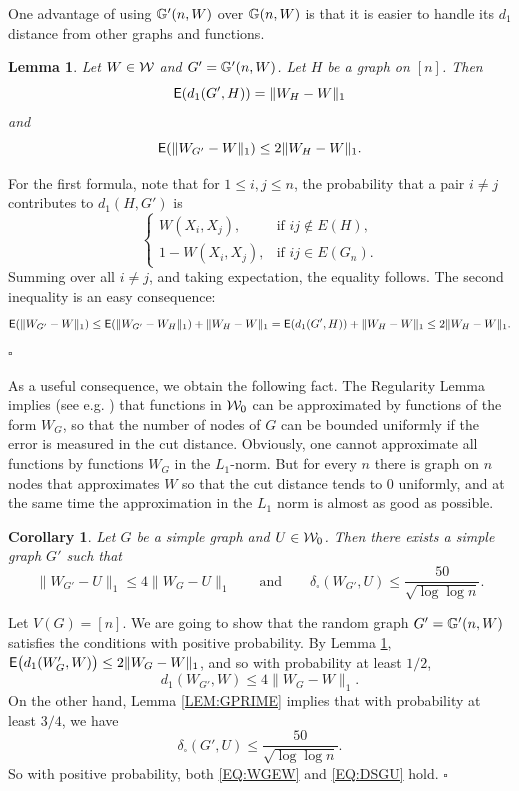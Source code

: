\documentclass{article}
\newtheorem{lemma}[theorem]{Lemma}
\newtheorem{corollary}[theorem]{Corollary}
\newenvironment{proof}{\medskip\noindent{\bf Proof. }}{\hfill$\square$\medskip}
\begin{document}
One advantage of using ${\mathbb G}'(n,W)$ over ${\mathbb G}(n,W)$ is that it is
easier to handle its $d_1$ distance from other graphs and functions.

\begin{lemma}\label{LEM:GPRIMEL1}
Let $W\in\mathcal{W}$ and $G'={\mathbb G}'(n,W)$. Let $H$ be a graph on $[n]$. Then
\[
{\sf E}(d_1(G',H))= \|W_H-W\|_1
\]
and
\[
{\sf E}(\|W_{G'}-W\|_1)\le 2\|W_H-W\|_1.
\]
\end{lemma}

\begin{proof}
For the first formula, note that for $1\le i,j\le n$, the probability
that a pair $i\not=j$ contributes to $d_1(H,G')$ is
\[
  \begin{cases}
    W(X_i,X_j), & \text{if $ij\notin E(H)$}, \\
    1-W(X_i,X_j), & \text{if $ij\in E(G_n)$}.
  \end{cases}
\]
Summing over all $i\not=j$, and taking expectation, the equality
follows. The second inequality is an easy consequence:
\[
{\sf E}(\|W_{G'}-W\|_1) \le {\sf E}(\|W_{G'}-W_H\|_1)+\|W_H-W\|_1
={\sf E}(d_1(G',H))+\|W_H-W\|_1\le 2\|W_H-W\|_1.
\]
\end{proof}

As a useful consequence, we obtain the following fact. The Regularity
Lemma implies (see e.g. \cite{LSz2}) that functions in $\mathcal{W}_0$ can be
approximated by functions of the form $W_G$, so that the number of
nodes of $G$ can be bounded uniformly if the error is measured in the
cut distance. Obviously, one cannot approximate all functions by
functions $W_G$ in the $L_1$-norm. But for every $n$ there is graph
on $n$ nodes that approximates $W$ so that the cut distance tends to
$0$ uniformly, and at the same time the approximation in the $L_1$
norm is almost as good as possible.

\begin{corollary}\label{COR:SQUARECLOSE}
Let $G$ be a simple graph and $U\in\mathcal{W}_0$. Then there exists a simple
graph $G'$ such that
\[
\|W_{G'}-U\|_1\le 4\|W_G-U\|_1\qquad\text{and}\qquad
\delta_\square(W_{G'},U)\le \frac{50}{\sqrt{\log\log n}}.
\]
\end{corollary}

\begin{proof}
Let $V(G)=[n]$. We are going to show that the random graph
$G'={\mathbb G}'(n,W)$ satisfies the conditions with positive probability. By
Lemma \ref{LEM:GPRIMEL1}, ${\sf E}\bigl(d_1(W_G',W)\bigr) \le
2\|W_G-W\|_1$, and so with probability at least $1/2$,
\begin{equation}\label{EQ:WGEW}
d_1(W_{G'},W)\le 4\|W_G-W\|_1.
\end{equation}
On the other hand, Lemma \ref{LEM:GPRIME} implies that with
probability at least $3/4$, we have
\begin{equation}\label{EQ:DSGU}
\delta_\square(G',U) \le \frac{50}{\sqrt{\log\log n}}.
\end{equation}
So with positive probability, both \eqref{EQ:WGEW} and
\eqref{EQ:DSGU} hold.
\end{proof}
\end{document}
